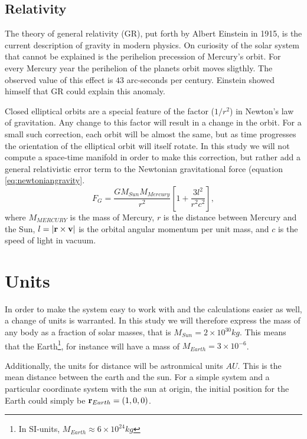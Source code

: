 \documentclass[10pt, a4paper]{amsart}
\begin{document}
\subsection{Relativity}

The theory of general relativity (GR), put forth by Albert Einstein in 1915, is the current description of gravity in modern physics. On curiosity of the solar system that cannot be explained is the perihelion precession of Mercury's orbit. For every Mercury year the perihelion of the planets orbit moves sligthly. The observed value of this effect is $43$ arc-seconds per century. Einstein showed himself that GR could explain this anomaly.

Closed elliptical orbits are a special feature of the factor ($1/r^2$) in Newton's law of gravitation. Any change to this factor will result in a change in the orbit. For a small such correction, each orbit will be almost the same, but as time progresses the orientation of the elliptical orbit will itself rotate. In this study we will not compute a space-time manifold in order to make this correction, but rather add a general relativistic error term to the Newtonian gravitational force (equation \ref{eq:newtoniangravity}.
\begin{equation}
\label{eq:relativenewton}
F_G = \frac{GM_{Sun}M_{Mercury}}{r^2}\left[1+\frac{3l^2}{r^2c^2} \right],
\end{equation}
where $M_{MERCURY}$ is the mass of Mercury, $r$ is the distance between Mercury and the Sun, $l=\abs{\vb{r}\times\vb{v}}$ is the orbital angular momentum per unit mass, and $c$ is the speed of light in vacuum.

\section{Units}
In order to make the system easy to work with and the calculations easier as well, a change of units is warranted. In this study we will therefore express the mass of any body as a fraction of solar masses, that is $M_{Sun} = 2\times10^{30}kg$. This means that the Earth\footnote{In SI-units, $M_{Earth}\approx6\times10^{24}kg$}, for instance will have a mass of $M_{Earth}= 3\times10^{-6}$.

Additionally, the units for distance will be astronmical units $AU$. This is the mean distance between the earth and the sun. For a simple system and a particular coordinate system with the sun at origin, the initial position for the Earth could simply be $\vb{r}_ {Earth}=(1,0,0)$.
\end{document}
